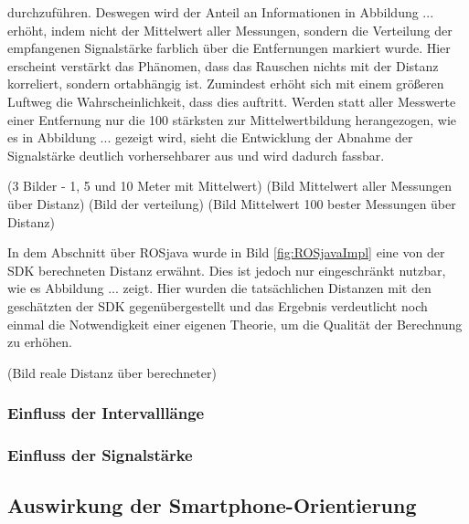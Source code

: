 durchzuführen. Deswegen wird der Anteil an Informationen in Abbildung ... erhöht, indem nicht der Mittelwert aller Messungen, sondern die Verteilung der empfangenen Signalstärke farblich über die Entfernungen markiert wurde. Hier erscheint verstärkt das Phänomen, dass das Rauschen nichts mit der Distanz korreliert, sondern ortabhängig ist. Zumindest erhöht sich mit einem größeren Luftweg die Wahrscheinlichkeit, dass dies auftritt. Werden statt aller Messwerte einer Entfernung nur die 100 stärksten zur Mittelwertbildung herangezogen, wie es in Abbildung ... gezeigt wird, sieht die Entwicklung der Abnahme der Signalstärke deutlich vorhersehbarer aus und wird dadurch fassbar. 

(3 Bilder - 1, 5 und 10 Meter mit Mittelwert) 
(Bild Mittelwert aller Messungen über Distanz)
(Bild der verteilung)
(Bild Mittelwert 100 bester Messungen über Distanz)

In dem Abschnitt über ROSjava wurde in Bild \ref{fig:ROSjavaImpl} eine von der SDK berechneten Distanz erwähnt. Dies ist jedoch nur eingeschränkt nutzbar, wie es Abbildung ... zeigt. Hier wurden die tatsächlichen Distanzen mit den geschätzten der SDK gegenübergestellt und das Ergebnis verdeutlicht noch einmal die Notwendigkeit einer eigenen Theorie, um die Qualität der Berechnung zu erhöhen.

(Bild reale Distanz über berechneter)

\subsubsection{Einfluss der Intervalllänge} 
\subsubsection{Einfluss der Signalstärke} 
\subsection{Auswirkung der Smartphone-Orientierung}
